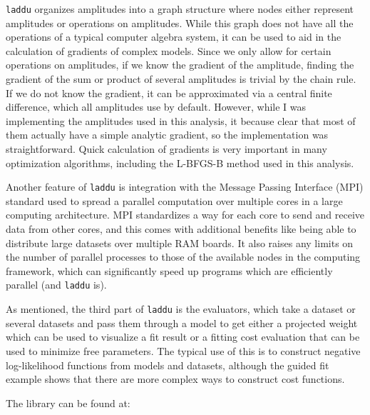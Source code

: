 \texttt{laddu} organizes amplitudes into a graph structure where nodes either represent amplitudes or operations on amplitudes. While this graph does not have all the operations of a typical computer algebra system, it can be used to aid in the calculation of gradients of complex models. Since we only allow for certain operations on amplitudes, if we know the gradient of the amplitude, finding the gradient of the sum or product of several amplitudes is trivial by the chain rule. If we do not know the gradient, it can be approximated via a central finite difference, which all amplitudes use by default. However, while I was implementing the amplitudes used in this analysis, it because clear that most of them actually have a simple analytic gradient, so the implementation was straightforward. Quick calculation of gradients is very important in many optimization algorithms, including the L-BFGS-B method used in this analysis.

Another feature of \texttt{laddu} is integration with the Message Passing Interface (MPI) standard used to spread a parallel computation over multiple cores in a large computing architecture. MPI standardizes a way for each core to send and receive data from other cores, and this comes with additional benefits like being able to distribute large datasets over multiple RAM boards. It also raises any limits on the number of parallel processes to those of the available nodes in the computing framework, which can significantly speed up programs which are efficiently parallel (and \texttt{laddu} is).

As mentioned, the third part of \texttt{laddu} is the evaluators, which take a dataset or several datasets and pass them through a model to get either a projected weight which can be used to visualize a fit result or a fitting cost evaluation that can be used to minimize free parameters. The typical use of this is to construct negative log-likelihood functions from models and datasets, although the guided fit example shows that there are more complex ways to construct cost functions.

The library can be found at:

\begin{center}
\end{center}
